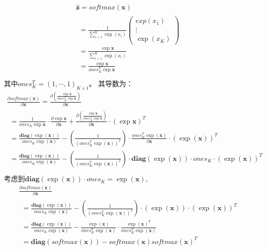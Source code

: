 \documentclass[11pt,fleqn, UTF8]{ctexbook} %
\begin{document}
\begin{gather}\label{2.24}
  \boldsymbol{\hat{z}} = softmax(\boldsymbol{x}) \\[6pt]
\begin{split}
  =\frac{1}{\sum_{i=1}^{K}\exp(x_i)}\begin{pmatrix}exp(x_1)\\ \vdots\\ \exp(x_K)\end{pmatrix}\\
  =\frac{\exp{\boldsymbol{x}}}{\sum_{i=1}^{K}\exp(x_i)}\\
  =\frac{\exp{\boldsymbol{x}}}{ones_K^T\exp{\boldsymbol{x}}}
  \end{split}\\[6pt]
\end{gather}
其中$ones_K^T=(1,\cdots,1)_{K \times 1}$。
其导数为：
\begin{gather}\label{2.27}
  \frac{\partial softmax(\boldsymbol{x})}{\partial \boldsymbol{x}}=\frac{\partial \left( \frac{\exp{\boldsymbol{x}}}{ones_K^T\exp{\boldsymbol{x}}}\right)}{\partial \boldsymbol{x}}\\[6pt]
  \begin{split}
  =\frac{1}{ones_K\exp{\boldsymbol{x}}}\cdot \frac{\partial\exp{\boldsymbol{x}}}{\partial \boldsymbol{x}}+\frac{\partial \left( \frac{\exp{\boldsymbol{x}}}{ones_K^T\exp{\boldsymbol{x}}}\right)}{\partial \boldsymbol{x}}\cdot\left(\exp{\boldsymbol{x}}\right)^T\\
  =\frac{\boldsymbol{diag}(\exp(\boldsymbol{x}))}{ones_K\exp(\boldsymbol{x})}-\left(\frac{1}{(ones_K^T\exp(\boldsymbol{x}))^2}\right) \cdot \frac{ones_K^T\exp(\boldsymbol{x})}{\partial \boldsymbol{x}}\cdot \left( \exp(\boldsymbol{x})\right)^T\\
  =\frac{\boldsymbol{diag}(\exp(\boldsymbol{x}))}{ones_K\exp(\boldsymbol{x})}-\left(\frac{1}{(ones_K^T\exp(\boldsymbol{x}))^2}\right) \cdot \boldsymbol{diag}(\exp(\boldsymbol{x}))\cdot ones_K \cdot \left( \exp(\boldsymbol{x})\right)^T
  \end{split}\\[6pt]
\end{gather}
考虑到$\boldsymbol{diag}(\exp(\boldsymbol{x}))\cdot ones_K=\exp(\boldsymbol{x})$,
\begin{gather}\label{2.30}
  \frac{\partial softmax(\boldsymbol{x})}{\partial \boldsymbol{x}}\\[6pt]
  \begin{split}
  =\frac{\boldsymbol{diag}(\exp(\boldsymbol{x}))}{ones_K\exp(\boldsymbol{x})}-\left(\frac{1}{(ones_K^T\exp(\boldsymbol{x}))^2}\right) \cdot \left( \exp(\boldsymbol{x})\right)\cdot \left( \exp(\boldsymbol{x})\right)^T\\
  =\frac{\boldsymbol{diag}(\exp(\boldsymbol{x}))}{ones_K\exp(\boldsymbol{x})}-\frac{\exp(\boldsymbol{x})}{ones_K^T\exp(\boldsymbol{x})} \cdot \frac{\exp(\boldsymbol{x})^T}{ones_K^T\exp(\boldsymbol{x})}\\
  =\boldsymbol{diag}(softmax(\boldsymbol{x}))-softmax(\boldsymbol{x})softmax(\boldsymbol{x})^T
  \end{split}\\[6pt]
\end{gather}
\end{document}
